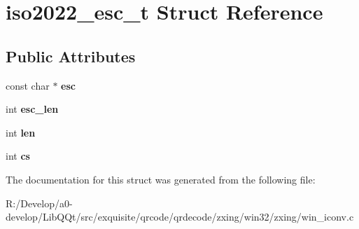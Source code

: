 \hypertarget{structiso2022__esc__t}{}\section{iso2022\+\_\+esc\+\_\+t Struct Reference}
\label{structiso2022__esc__t}
\subsection*{Public Attributes}
\begin{DoxyCompactItemize}
\item 
\mbox{\label{structiso2022__esc__t_aff9b50aa49c33f7701d25d568583a85e}} 
const char $\ast$ {\bfseries esc}
\item 
\mbox{\label{structiso2022__esc__t_a36985d0712f52bc45aa210a3a9cc8744}} 
int {\bfseries esc\+\_\+len}
\item 
\mbox{\label{structiso2022__esc__t_a145975cd39ea77bcffd40e62ffddcc7b}} 
int {\bfseries len}
\item 
\mbox{\label{structiso2022__esc__t_ac8f98c164517f0abd994605ca7d27ed4}} 
int {\bfseries cs}
\end{DoxyCompactItemize}


The documentation for this struct was generated from the following file\+:\begin{DoxyCompactItemize}
\item 
R\+:/\+Develop/a0-\/develop/\+Lib\+Q\+Qt/src/exquisite/qrcode/qrdecode/zxing/win32/zxing/win\+\_\+iconv.\+c\end{DoxyCompactItemize}
